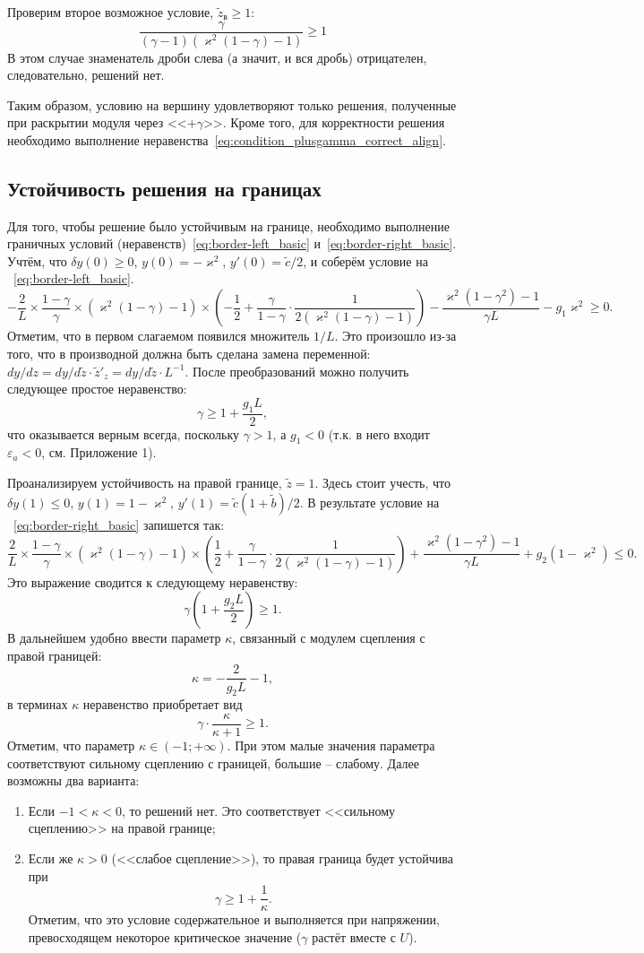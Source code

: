 \documentclass[a4paper, 12pt]{extarticle}
\def \ve {\varepsilon}
\def \vk {\varkappa}
\def \tz {\tilde{z}}
\def \tc {\tilde{c}}
\def \tb {\tilde{b}}
\begin{document}
Проверим второе возможное условие, $\tz_\text{в} \geqslant 1$:
$$
\frac{\gamma}{(\gamma-1)(\vk^2(1-\gamma)-1)} \geqslant 1
$$
В этом случае знаменатель дроби слева (а значит, и вся дробь) отрицателен, следовательно, решений нет.

Таким образом, условию на вершину удовлетворяют только решения, полученные при раскрытии модуля через <<$+\gamma$>>.
Кроме того, для корректности решения необходимо выполнение неравенства~\eqref{eq:condition_plusgamma_correct_align}.

\subsection{Устойчивость решения на границах}
Для того, чтобы решение было устойчивым на границе, необходимо выполнение граничных условий (неравенств)~\eqref{eq:border-left_basic} и~\eqref{eq:border-right_basic}. Учтём, что $\delta y(0) \geqslant 0$, $y(0) = -\vk^2$, $y'(0) = \tc/2$, и соберём условие на ~\eqref{eq:border-left_basic}.
$$
-\frac{2}{L}\times\frac{1-\gamma}{\gamma}\times(\vk^2(1-\gamma) - 1)\times\left( -\frac{1}{2} + \frac{\gamma}{1-\gamma}\cdot\frac{1}{2(\vk^2(1-\gamma)-1)} \right) - \frac{\vk^2(1-\gamma^2)-1}{\gamma L} - g_1\vk^2 \geqslant 0.
$$
Отметим, что в первом слагаемом появился множитель $1/L$.
Это произошло из-за того, что в производной должна быть сделана замена переменной: $dy/dz = dy/d\tz\cdot\tz'_z = dy/d\tz\cdot L^{-1}$.
После преобразований можно получить следующее простое неравенство:
$$
\gamma \geqslant 1 + \frac{g_1 L}{2},
$$
что оказывается верным всегда, поскольку $\gamma > 1$, а $g_1 < 0$ (т.к. в него входит $\ve_a < 0$, см. Приложение 1).

Проанализируем устойчивость на правой границе, $\tz = 1$.
Здесь стоит учесть, что $\delta y(1) \leqslant 0$, $y(1) = 1 - \vk^2$, $y'(1) = \tc(1+\tb)/2$.
В результате условие на ~\eqref{eq:border-right_basic} запишется так:
$$
\frac{2}{L}\times\frac{1-\gamma}{\gamma}\times(\vk^2(1-\gamma) - 1)\times\left( \frac{1}{2} + \frac{\gamma}{1-\gamma}\cdot\frac{1}{2(\vk^2(1-\gamma)-1)} \right) + \frac{\vk^2(1-\gamma^2)-1}{\gamma L} + g_2(1-\vk^2) \leqslant 0.
$$
Это выражение сводится к следующему неравенству:
$$
\gamma\left( 1+\frac{g_2 L}{2} \right) \geqslant 1.
$$
В дальнейшем удобно ввести параметр $\kappa$, связанный с модулем сцепления с правой границей:
$$
\kappa = -\frac{2}{g_2 L} - 1,
$$
в терминах $\kappa$ неравенство приобретает вид
$$
\gamma\cdot\frac{\kappa}{\kappa+1} \geqslant 1.
$$
Отметим, что параметр $\kappa \in (-1; +\infty)$.
При этом малые значения параметра соответствуют сильному сцеплению с границей, большие -- слабому.
Далее возможны два варианта:
\begin{enumerate}
	\item Если $-1 < \kappa < 0$, то решений нет. 
	Это соответствует <<сильному сцеплению>> на правой границе;
	\item Если же $\kappa >0$ (<<слабое сцепление>>), то правая граница будет устойчива при
	$$
	\gamma \geqslant 1 + \frac{1}{\kappa}.
	$$
	Отметим, что это условие содержательное и выполняется при напряжении, превосходящем некоторое критическое значение ($\gamma$ растёт вместе с $U$).
\end{enumerate}
\end{document}
